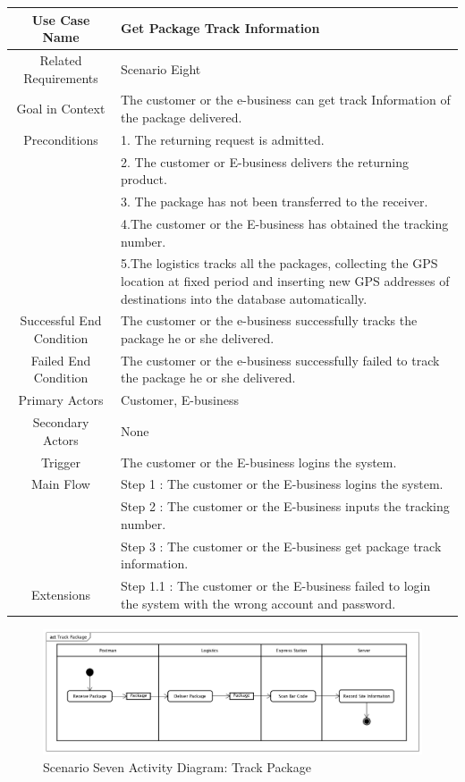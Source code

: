 \documentclass[12pt]{scrreprt}
\begin{document}
\begin{table}
  \centering
  \begin{tabular}{| c | p{11cm} |}
    \hline
    Use Case Name & Get Package Track Information\\
    \hline
    Related Requirements & Scenario Eight\\
    \hline
    Goal in Context & The customer or the e-business can get track Information
    of the package delivered.\\
    \hline
    Preconditions & 1. The returning request is admitted.\\
    & 2. The customer or E-business delivers the returning product.\\
    & 3. The package has not been transferred to the receiver.\\
    & 4.The customer or the E-business has obtained the tracking number.\\
    & 5.The logistics tracks all the packages, collecting the GPS location at
    fixed period and inserting new GPS addresses of destinations into the
    database automatically.\\
    \hline
    Successful End Condition & The customer or the e-business successfully
    tracks the package he or she delivered.\\
    \hline
    Failed End Condition & The customer or the e-business successfully failed
    to track the package he or she delivered.\\
    \hline
    Primary Actors & Customer, E-business\\
    \hline
    Secondary Actors & None\\
    \hline
    Trigger & The customer or the E-business logins the system.\\
    \hline
    Main Flow & Step 1 : The customer or the E-business logins the system.\\
    & Step 2 : The customer or the E-business inputs the tracking number.\\
    & Step 3 : The customer or the E-business get package track information.\\
    \hline
    Extensions & Step 1.1 : The customer or the E-business failed to login the
    system with the wrong account and password.\\
    \hline
  \end{tabular}
\end{table}

\begin{figure}[H]
  \centering\includegraphics[width=5in]{DocumentRes/8TrackPackage.png}
  \caption{Scenario Seven Activity Diagram: Track Package}
\end{figure}
\end{document}
